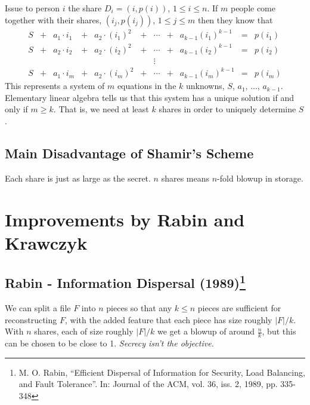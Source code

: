 \documentclass[12pt]{article}
\begin{document}
\noindent Issue to person $i$ the share $D_i = (i, p(i))$, $1\leq i\leq n$. If $m$ people come together with their shares, $(i_j, p(i_j))$, $1\leq j\leq m$ then they know that
\[
\begin{array}{ccccccccccc}
	S & + & a_1\cdot i_1 & + & a_2\cdot (i_1)^2 &+& \cdots& + & a_{k-1}(i_1)^{k-1} & = & p(i_1)\\
	S & + & a_2\cdot i_2 & + & a_2\cdot (i_2)^2 &+& \cdots& + & a_{k-1}(i_2)^{k-1} & = & p(i_2)\\
	&&&&&&\vdots&&&\\
	S & + & a_1\cdot i_m & + & a_2\cdot (i_m)^2 &+& \cdots& + & a_{k-1}(i_m)^{k-1} & = & p(i_m)
\end{array}
\]
This represents a system of $m$ equations in the $k$ unknowns, $S$, $a_1$, $\ldots$, $a_{k-1}$. Elementary linear algebra tells us that this system has a unique solution if and only if $m\geq k$. That is, we need at least $k$ shares in order to uniquely determine $S$.

\subsection*{Main Disadvantage of Shamir's Scheme}
Each share is just as large as the secret. $n$ shares means $n$-fold blowup in storage.

\section*{Improvements by Rabin and Krawczyk}
\subsection*{Rabin - Information Dispersal (1989)\footnote{M. O. Rabin, ``Efficient Dispersal of Information for Security, Load Balancing, and Fault Tolerance''. In: Journal of the ACM, vol. 36, iss. 2, 1989, pp. 335-348}}
We can split a file $F$ into $n$ pieces so that any $k\leq n$ pieces are sufficient for reconstructing $F$, with the added feature that each piece has size roughly $|F|/k$. With $n$ shares, each of size roughly $|F|/k$ we get a blowup of around $\frac{n}{k}$, but this can be chosen to be close to 1. \textit{Secrecy isn't the objective.}\\
\end{document}
